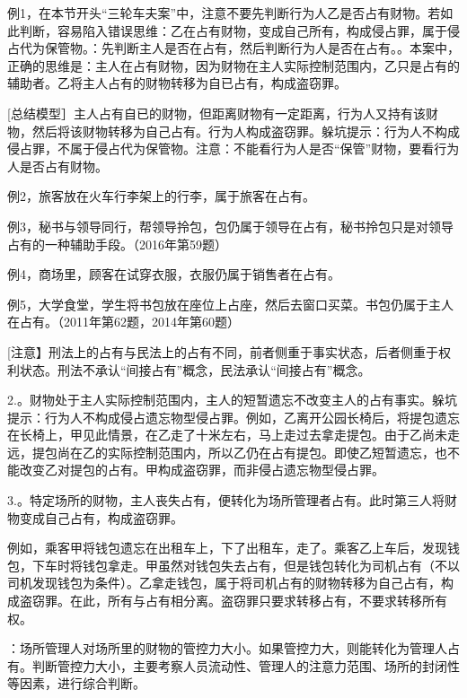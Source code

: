 例1，在本节开头“三轮车夫案”中，注意不要先判断行为人乙是否占有财物。若如此判断，容易陷入错误思维：乙在占有财物，变成自己所有，构成侵占罪，属于侵占代为保管物。：先判断主人是否在占有，然后判断行为人是否在占有。。本案中，正确的思维是：主人在占有财物，因为财物在主人实际控制范围内，乙只是占有的辅助者。乙将主人占有的财物转移为自已占有，构成盗窃罪。

[总结模型］主人占有自已的财物，但距离财物有一定距离，行为人又持有该财物，然后将该财物转移为自己占有。行为人构成盗窃罪。躲坑提示：行为人不构成侵占罪，不属于侵占代为保管物。注意：不能看行为人是否“保管”财物，要看行为人是否占有财物。


例2，旅客放在火车行李架上的行李，属于旅客在占有。

例3，秘书与领导同行，帮领导拎包，包仍属于领导在占有，秘书拎包只是对领导占有的一种辅助手段。（2016年第59题）

例4，商场里，顾客在试穿衣服，衣服仍属于销售者在占有。

例5，大学食堂，学生将书包放在座位上占座，然后去窗口买菜。书包仍属于主人在占有。（2011年第62题，2014年第60题）

[注意】刑法上的占有与民法上的占有不同，前者侧重于事实状态，后者侧重于权利状态。刑法不承认“间接占有”概念，民法承认“间接占有”概念。

2.。财物处于主人实际控制范围内，主人的短暂遗忘不改变主人的占有事实。躲坑提示：行为人不构成侵占遗忘物型侵占罪。例如，乙离开公园长椅后，将提包遗忘在长椅上，甲见此情景，在乙走了十米左右，马上走过去拿走提包。由于乙尚未走远，提包尚在乙的实际控制范围内，所以乙仍在占有提包。即使乙短暂遗忘，也不能改变乙对提包的占有。甲构成盗窃罪，而非侵占遗忘物型侵占罪。

3.。特定场所的财物，主人丧失占有，便转化为场所管理者占有。此时第三人将财物变成自己占有，构成盗窃罪。

例如，乘客甲将钱包遗忘在出租车上，下了出租车，走了。乘客乙上车后，发现钱包，下车时将钱包拿走。甲虽然对钱包失去占有，但是钱包转化为司机占有（不以司机发现钱包为条件）。乙拿走钱包，属于将司机占有的财物转移为自己占有，构成盗窃罪。在此，所有与占有相分离。盗窃罪只要求转移占有，不要求转移所有权。

：场所管理人对场所里的财物的管控力大小。如果管控力大，则能转化为管理人占有。判断管控力大小，主要考察人员流动性、管理人的注意力范围、场所的封闭性等因素，进行综合判断。

